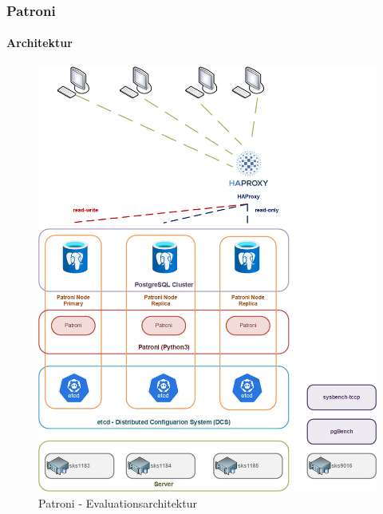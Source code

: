
\begin{flushleft}
    \subsubsection{Patroni}
    \paragraph{Architektur}
        \begin{figure}[H]
            \centering
            \includegraphics[width=0.8\linewidth]{source/implementation/evaluation/postgresql_ha_solutions/patroni/patroni-evaluation-architecture}
            \caption{Patroni - Evaluationsarchitektur}
            \label{fig:patroni-evaluation-architecture.png}
        \end{figure}
\end{flushleft}